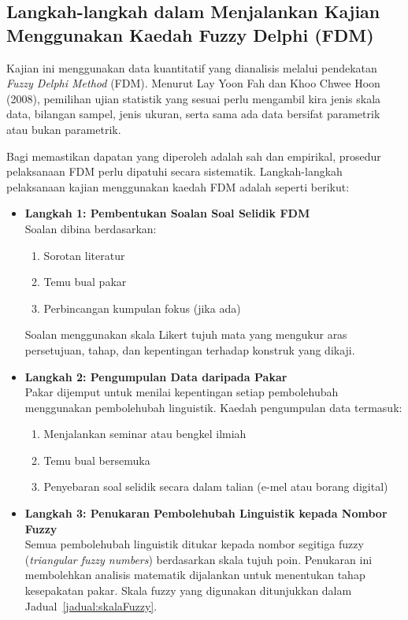 \begin{itemize}
\begin{enumerate}[label*=\roman*.]
\subsection{Langkah-langkah dalam Menjalankan Kajian Menggunakan Kaedah Fuzzy Delphi (FDM)}

Kajian ini menggunakan data kuantitatif yang dianalisis melalui pendekatan \textit{Fuzzy Delphi Method} (FDM). Menurut Lay Yoon Fah dan Khoo Chwee Hoon (2008), pemilihan ujian statistik yang sesuai perlu mengambil kira jenis skala data, bilangan sampel, jenis ukuran, serta sama ada data bersifat parametrik atau bukan parametrik.

Bagi memastikan dapatan yang diperoleh adalah sah dan empirikal, prosedur pelaksanaan FDM perlu dipatuhi secara sistematik. Langkah-langkah pelaksanaan kajian menggunakan kaedah FDM adalah seperti berikut:
\end{enumerate}
\begin{itemize}
  \item \textbf{Langkah 1: Pembentukan Soalan Soal Selidik FDM} \\
  Soalan dibina berdasarkan:
  \begin{enumerate}[label*=\roman*.]
    \item Sorotan literatur
    \item Temu bual pakar
    \item Perbincangan kumpulan fokus (jika ada)
  \end{enumerate}
  Soalan menggunakan skala Likert tujuh mata yang mengukur aras persetujuan, tahap, dan kepentingan terhadap konstruk yang dikaji.

  \item \textbf{Langkah 2: Pengumpulan Data daripada Pakar} \\
  Pakar dijemput untuk menilai kepentingan setiap pembolehubah menggunakan pembolehubah linguistik. Kaedah pengumpulan data termasuk:
  \begin{enumerate}[label*=\roman*.]
    \item Menjalankan seminar atau bengkel ilmiah
    \item Temu bual bersemuka
    \item Penyebaran soal selidik secara dalam talian (e-mel atau borang digital)
  \end{enumerate}

  \item \textbf{Langkah 3: Penukaran Pembolehubah Linguistik kepada Nombor Fuzzy} \\
  Semua pembolehubah linguistik ditukar kepada nombor segitiga fuzzy (\textit{triangular fuzzy numbers}) berdasarkan skala tujuh poin. Penukaran ini membolehkan analisis matematik dijalankan untuk menentukan tahap kesepakatan pakar. Skala fuzzy yang digunakan ditunjukkan dalam Jadual~\ref{jadual:skalaFuzzy}.
\end{itemize}


\end{itemize}
